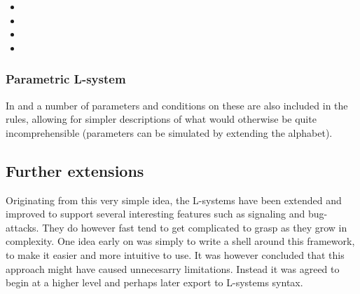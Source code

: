 \begin{itemize}

    \item {}
    \item {}
    \item {}
    \item \todo{}

\end{itemize}

\subsubsection{Parametric L-system}

\label{param_l_system}

    In  and  a number of parameters and
    conditions on these are also included in the rules, allowing for
    simpler descriptions of what would otherwise be quite
    incomprehensible (parameters can be simulated by extending the
    alphabet). 


\subsection{Further extensions}

    Originating from this very simple idea, the L-systems have been
    extended and improved to support several interesting features such
    as signaling and bug-attacks. They do however fast tend to get
    complicated to grasp as they grow in complexity. One idea early on
    was simply to write a shell around this framework, to make it
    easier and more intuitive to use. It was however concluded that
    this approach might have caused unnecesarry limitations. Instead
    it was agreed to begin at a higher level and perhaps later export
    to L-systems syntax.



